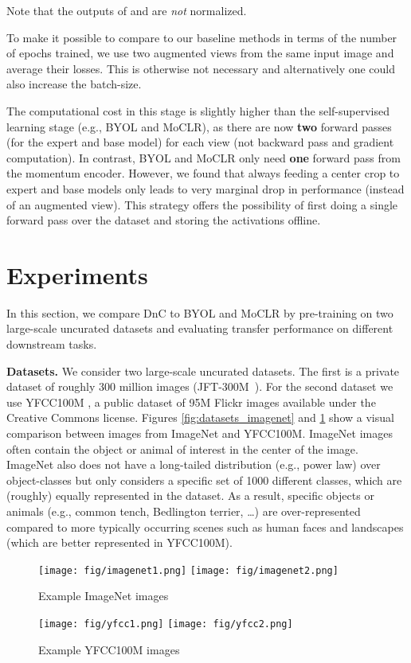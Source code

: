 \documentclass[final]{cvpr}
\newcommand\baseline{MoCLR}
\newcommand\jft{JFT-300M}
\begin{document}
Note that the outputs of  and  are \emph{not}  normalized. 

To make it possible to compare to our baseline methods in terms of the number of epochs trained, we use two augmented views from the same input image and average their losses. This is otherwise not necessary and alternatively one could also increase the batch-size.

The computational cost in this stage is slightly higher than the self-supervised learning stage (e.g., BYOL and \baseline{}), as there are now \textbf{two} forward passes (for the expert and base model) for each view (not backward pass and gradient computation). In contrast, BYOL and \baseline{} only need \textbf{one} forward pass from the momentum encoder. However, we found that always feeding a center crop to expert and base models only leads to very marginal drop in performance (instead of an augmented view). This strategy offers the possibility of first doing a single forward pass over the dataset and storing the activations offline. \section{Experiments}


In this section, we compare DnC to BYOL and \baseline{} by pre-training on two large-scale uncurated datasets and evaluating transfer performance on different downstream tasks.

\noindent \textbf{Datasets.} We consider two large-scale uncurated  datasets. The first is a private dataset of roughly 300 million images (\jft{}~\cite{sun2017revisiting}). For the second dataset we use YFCC100M \cite{thomee2016yfcc100m}, a public dataset of 95M Flickr images available under the Creative Commons license. Figures \ref{fig:datasets_imagenet} and \ref{fig:datasets_yfcc} show a visual comparison between images from ImageNet and YFCC100M. ImageNet images often contain the object or animal of interest in the center of the image. ImageNet also does not have a long-tailed distribution (e.g., power law) over object-classes but only considers a specific set of 1000 different classes, which are (roughly) equally represented in the dataset. As a result, specific objects or animals (e.g., common tench, Bedlington terrier, \dots) are over-represented compared to more typically occurring scenes such as human faces and landscapes (which are better represented in YFCC100M). 

\begin{figure}[t]
  \centering
  \texttt{[image: fig/imagenet1.png]}
  \texttt{[image: fig/imagenet2.png]}
  \caption{\label{fig:datasets_imagenet} Example ImageNet images}
  \texttt{[image: fig/yfcc1.png]}
  \texttt{[image: fig/yfcc2.png]}
  \caption{\label{fig:datasets_yfcc} Example YFCC100M images}
\end{figure}
\end{document}
